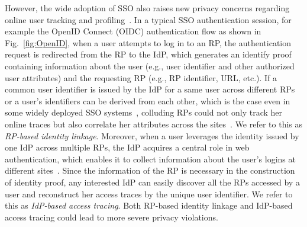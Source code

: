 However, the wide adoption of SSO also raises new privacy concerns regarding online user tracking and profiling~\cite{maler2008venn,NIST2017draft}. In a typical SSO authentication session, for example the OpenID Connect (OIDC) authentication flow as shown in Fig.~\ref{fig:OpenID}, when a user attempts to log in to an RP, the authentication request is redirected from the RP to the IdP, which generates an identify proof containing information about the user (e.g., user identifier and other authorized user attributes) and the requesting RP (e.g., RP identifier, URL, etc.). If a common user identifier is issued by the IdP for a same user across different RPs or a user's identifiers can be derived from each other, which is the case even in some widely deployed SSO systems~\cite{BrowserID,SPRESSO}, colluding RPs could not only track her online traces but also correlate her attributes across the sites~\cite{maler2008venn}. We refer to this as {\em RP-based identity linkage}. Moreover, when a user leverages the identity issued by one IdP across multiple RPs, the IdP acquires a central role in web authentication, which enables it to collect information about the user's logins at different sites~\cite{maler2008venn}. Since the information of the RP is necessary in the construction of identity proof, any interested IdP can easily discover all the RPs accessed by a user and reconstruct her access traces by the unique user identifier. We refer to this as {\em IdP-based access tracing}. Both RP-based identity linkage and IdP-based access tracing could lead to more severe privacy violations.



